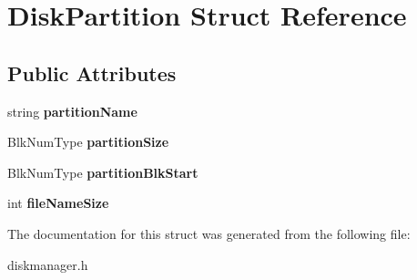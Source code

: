\hypertarget{structDiskPartition}{}\section{Disk\+Partition Struct Reference}
\label{structDiskPartition}
\subsection*{Public Attributes}
\begin{DoxyCompactItemize}
\item 
\mbox{\label{structDiskPartition_a8c89b5f115fa534a3cb5d76505de97cb}} 
string {\bfseries partition\+Name}
\item 
\mbox{\label{structDiskPartition_a61dfe31b8baf361738168c2521c19286}} 
Blk\+Num\+Type {\bfseries partition\+Size}
\item 
\mbox{\label{structDiskPartition_a2b5b89e7739ffa6ac21772a92f88e35f}} 
Blk\+Num\+Type {\bfseries partition\+Blk\+Start}
\item 
\mbox{\label{structDiskPartition_a6fd44394d9d8bf83fa61cfd12be25412}} 
int {\bfseries file\+Name\+Size}
\end{DoxyCompactItemize}


The documentation for this struct was generated from the following file\+:\begin{DoxyCompactItemize}
\item 
diskmanager.\+h\end{DoxyCompactItemize}
